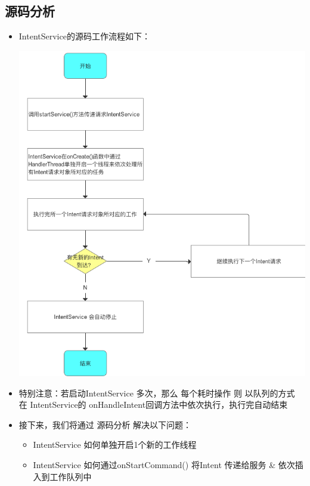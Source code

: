 \documentclass[9pt, b5paper]{article}
\begin{document}
\subsection{源码分析}
\label{sec-4-7}
\begin{itemize}
\item IntentService的源码工作流程如下：

\includegraphics[width=.9\linewidth]{./pic/IntentService.png}
\item 特别注意：若启动IntentService 多次，那么 每个耗时操作 则 以队列的方式 在 IntentService的 onHandleIntent回调方法中依次执行，执行完自动结束
\item 接下来，我们将通过 源码分析 解决以下问题：
\begin{itemize}
\item IntentService 如何单独开启1个新的工作线程
\item IntentService 如何通过onStartCommand() 将Intent 传递给服务 \& 依次插入到工作队列中
\end{itemize}
\end{itemize}
\end{document}
